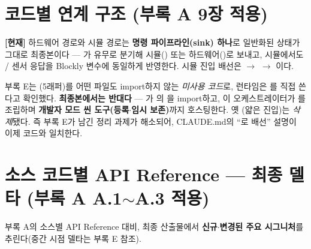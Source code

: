 \section{코드별 연계 구조 (부록 A 9장 적용)}
\textbf{[현재]} 하드웨어 경로와 시뮬 경로는 \textbf{명령 파이프라인(sink) 하나}로 일반화된
상태가 그대로 최종본이다 --- 가  유무로 분기해
시뮬() 또는 하드웨어()로 보내고, 시뮬에서도
/ 센서 응답을 Blockly 변수에 동일하게 반영한다. 시뮬 진입 배선은
 $\to$  $\to$
이다.

\begin{notebox}
\small
부록 E는 (5래퍼)를 어떤 파일도 import하지 않는 \emph{미사용 코드}로,
런타임은 를 직접 쓴다고 확인했다. \textbf{최종본에서는 반대다} --- 가
의 을 import하고, 이 오케스트레이터가
를 조립하며 \textbf{개발자 모드 씬 도구(등록$\cdot$임시 보존)}까지 호스팅한다.
옛 (얇은 진입)는 \emph{삭제}됐다. 즉 부록 E가 남긴 정리 과제가 해소되어,
CLAUDE.md의 ``로 배선'' 설명이 이제 코드와 일치한다.
\end{notebox}

\section{소스 코드별 API Reference --- 최종 델타 (부록 A A.1$\sim$A.3 적용)}
부록 A의 소스별 API Reference 대비, 최종 산출물에서 \textbf{신규$\cdot$변경된 주요 시그니처}를
추린다(중간 시점 델타는 부록 E 참조).

